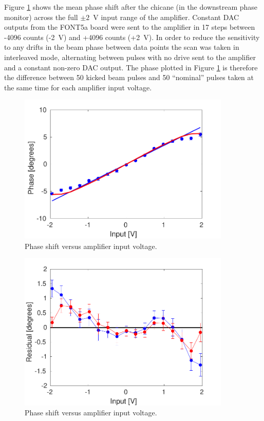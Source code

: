Figure \ref{f:phaseVsAmpVoltage} shows the mean phase shift after the chicane (in the downstream phase monitor) across the full \(\pm2\)~V input range of the amplifier. Constant DAC outputs from the FONT5a board were sent to the amplifier in 17 steps between -4096 counts (-2~V) and +4096 counts (+2~V). In order to reduce the sensitivity to any drifts in the beam phase between data points the scan was taken in interleaved mode, alternating between pulses with no drive sent to the amplifier and a constant non-zero DAC output. The phase plotted in Figure \ref{f:phaseVsAmpVoltage} is therefore the difference between 50 kicked beam pulses and 50 ``nominal'' pulses taken at the same time for each amplifier input voltage. 

\begin{figure}
  \centering
  \includegraphics[width=0.9\textwidth]{Figures/commissioning/phaseVsAmpVoltage}
  \caption{Phase shift versus amplifier input voltage.}
  \label{f:phaseVsAmpVoltage}
\end{figure}

\begin{figure}
  \centering
  \includegraphics[width=0.9\textwidth]{Figures/commissioning/phaseVsAmpVoltage_residuals}
  \caption{Phase shift versus amplifier input voltage.}
  \label{f:phaseVsAmp_resid}
\end{figure}

